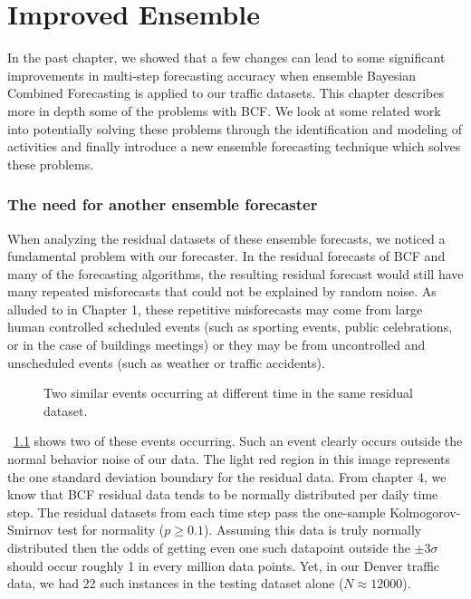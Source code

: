 \chapter{Improved Ensemble}
In the past chapter, we showed that a few changes can lead to some significant improvements in multi-step forecasting accuracy when ensemble Bayesian Combined Forecasting is applied to our traffic datasets.  This chapter describes more in depth some of the problems with BCF.  We look at some related work into potentially solving these problems through the identification and modeling of activities and finally introduce a new ensemble forecasting technique which solves these problems.  


\subsection{The need for another ensemble forecaster}
When analyzing the residual datasets of these ensemble forecasts, we noticed a fundamental problem with our forecaster.  In the residual forecasts of BCF and many of the forecasting algorithms, the resulting residual forecast would still have many repeated misforecasts that could not be explained by random noise.  As alluded to in Chapter 1, these repetitive misforecasts may come from large human controlled scheduled events (such as sporting events, public celebrations, or in the case of buildings meetings) or they may be from uncontrolled and unscheduled events (such as weather or traffic accidents).  

\begin{figure}[]
	\begin{center}
	\end{center}
	\caption{Two similar events occurring at different time in the same residual dataset.}
	\label{fig:sample_residual_events}
\end{figure}

~\ref{fig:sample_residual_events} shows two of these events occurring.  Such an event clearly occurs outside the normal behavior noise of our data.  The light red region in this image represents the one standard deviation boundary for the residual data.  From chapter 4, we know that BCF residual data tends to be normally distributed per daily time step.  The residual datasets from each time step pass the one-sample Kolmogorov-Smirnov \cite{Marsaglia2003, Lopes2007} test for normality ($p \ge 0.1$).  Assuming this data is truly normally distributed then the odds of getting even one such datapoint outside the $\pm 3 \sigma$ should occur roughly 1 in every million data points.  Yet, in our Denver traffic data, we had 22 such instances in the testing dataset alone ($N \approx 12000$).  

